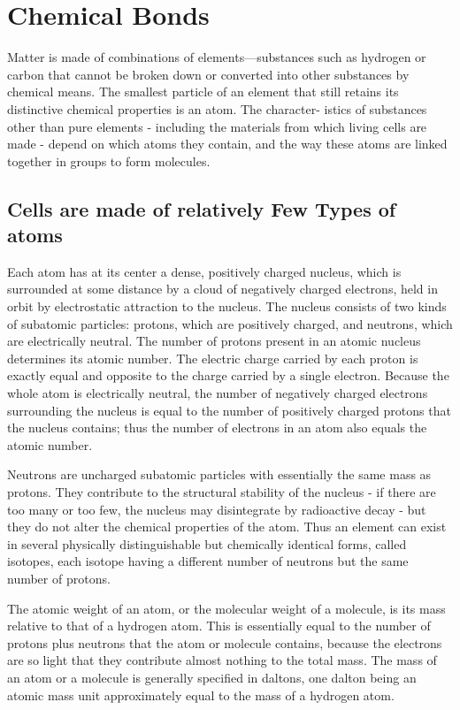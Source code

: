 \section{Chemical Bonds}

Matter is made of combinations of elements—substances such as hydrogen 
or carbon that cannot be broken down or converted into other
substances by chemical means. The smallest particle of an element that
still retains its distinctive chemical properties is an atom. The character-
istics of substances other than pure elements - including the materials
from which living cells are made - depend on which atoms they contain,
and the way these atoms are linked together in groups to form molecules.

\subsection{Cells are made of relatively Few Types of atoms}

Each atom has at its center a dense, positively charged nucleus, which
is surrounded at some distance by a cloud of negatively charged electrons, 
held in orbit by electrostatic attraction to the nucleus.
The nucleus consists of two kinds of subatomic particles: protons, which
are positively charged, and neutrons, which are electrically neutral. The
number of protons present in an atomic nucleus determines its atomic
number. The electric charge carried by each proton is exactly
equal and opposite to the charge carried by a single electron. Because
the whole atom is electrically neutral, the number of negatively charged
electrons surrounding the nucleus is equal to the number of positively
charged protons that the nucleus contains; thus the number of electrons
in an atom also equals the atomic number.

Neutrons are uncharged subatomic particles with essentially the same
mass as protons. They contribute to the structural stability of the nucleus - 
if there are too many or too few, the nucleus may disintegrate by
radioactive decay - but they do not alter the chemical properties of the
atom. Thus an element can exist in several physically distinguishable but
chemically identical forms, called isotopes, each isotope having a different
number of neutrons but the same number of protons.

The atomic weight of an atom, or the molecular weight of a molecule,
is its mass relative to that of a hydrogen atom. This is essentially equal to
the number of protons plus neutrons that the atom or molecule contains,
because the electrons are so light that they contribute almost nothing to
the total mass. The mass of an atom or a molecule is generally specified in 
daltons, one dalton being an atomic mass unit approximately equal to the mass 
of a hydrogen atom.

